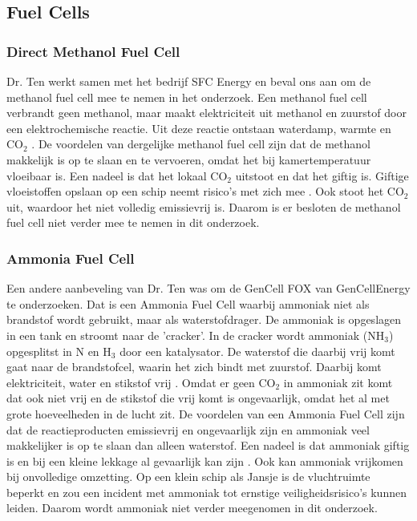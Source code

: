 \subsection*{Fuel Cells}
\subsubsection{\textbf{Direct Methanol Fuel Cell}}
Dr. Ten werkt samen met het bedrijf SFC Energy en beval ons aan om de methanol fuel cell mee te nemen in het onderzoek. Een methanol fuel cell verbrandt geen methanol, maar maakt elektriciteit uit methanol en zuurstof door een elektrochemische reactie. Uit deze reactie ontstaan waterdamp, warmte en CO$_2$ \cite{SFCMethanolFuelCell}. De voordelen van dergelijke methanol fuel cell zijn dat de methanol makkelijk is op te slaan en te vervoeren, omdat het bij kamertemperatuur vloeibaar is. Een nadeel is dat het lokaal CO$_2$ uitstoot en dat het giftig is. Giftige vloeistoffen opslaan op een schip neemt risico's met zich mee \label{methanolgiftig}. Ook stoot het CO$_2$ uit, waardoor het niet volledig emissievrij is. Daarom is er besloten de methanol fuel cell niet verder mee te nemen in dit onderzoek.

\subsubsection{\textbf{Ammonia Fuel Cell}}
Een andere aanbeveling van Dr. Ten was om de GenCell FOX van GenCellEnergy te onderzoeken. Dat is een Ammonia Fuel Cell waarbij ammoniak niet als brandstof wordt gebruikt, maar als waterstofdrager. De ammoniak is opgeslagen in een tank en stroomt naar de 'cracker'. In de cracker wordt ammoniak (NH$_3$) opgesplitst in N en H$_3$ door een katalysator. De waterstof die daarbij vrij komt gaat naar de brandstofcel, waarin het zich bindt met zuurstof. Daarbij komt elektriciteit, water en stikstof vrij \cite{GenCellFOXVideo}. Omdat er geen CO$_2$ in ammoniak zit komt dat ook niet vrij en de stikstof die vrij komt is ongevaarlijk, omdat het al met grote hoeveelheden in de lucht zit. De voordelen van een Ammonia Fuel Cell zijn dat de reactieproducten emissievrij en ongevaarlijk zijn en ammoniak veel makkelijker is op te slaan dan alleen waterstof. Een nadeel is dat ammoniak giftig is en bij een kleine lekkage al gevaarlijk kan zijn \cite{NIPVAmmoniakincidenten} \label{Ammoniakgiftig}. Ook kan ammoniak vrijkomen bij onvolledige omzetting. Op een klein schip als Jansje is de vluchtruimte beperkt en zou een incident met ammoniak tot ernstige veiligheidsrisico's kunnen leiden. Daarom wordt ammoniak niet verder meegenomen in dit onderzoek.

